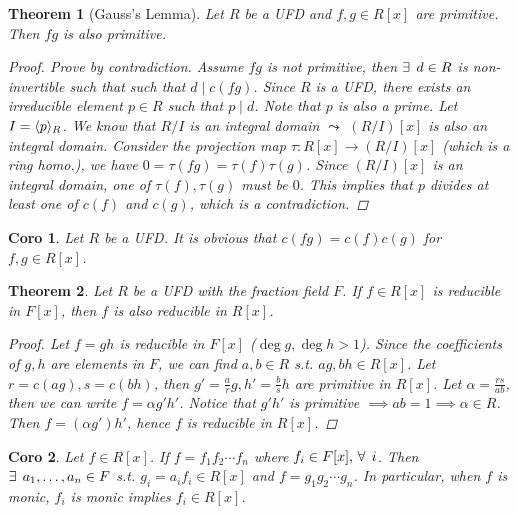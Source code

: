 \documentclass[a4paper]{article}
\let\existstemp\exists
\let\foralltemp\forall
\renewcommand*{\exists}{\existstemp\mkern4mu}
\renewcommand*{\forall}{\foralltemp\mkern4mu}
\DeclarePairedDelimiter{\gen}{\langle}{\rangle} %
\newcommand*\quot[2]{{#1}/{#2}}
\theoremstyle{mystyle}
\newtheorem{theorem}{Theorem}
\newtheorem{coro}{Coro}
\begin{document}
\begin{theorem}[Gauss's Lemma]
  Let $R$ be a UFD and $f, g \in R[x]$ are primitive. Then $fg$
  is also primitive.
  \begin{proof}
    Prove by contradiction. Assume $fg$ is not primitive, then
    $\exists d \in R$ is non-invertible such that such that $d \mid c(fg)$.
    Since $R$ is a UFD, there exists an irreducible element $p \in R$
    such that $p \mid d$. Note that $p$ is also a prime. Let $I = \gen{p}_R$.
    We know that $\quot{R}{I}$ is an integral domain $\leadsto$
    $(\quot{R}{I})[x]$ is also an integral domain.
    Consider the projection map $\tau: R[x] \to (\quot{R}{I})[x]$ (which is
    a ring homo.), we have $0 = \tau(fg) = \tau(f)\tau(g)$. Since
    $(\quot{R}{I})[x]$ is an integral domain, one of $\tau(f), \tau(g)$ must
    be $0$. This implies that $p$ divides at least one of $c(f)$ and $c(g)$,
    which is a contradiction.
  \end{proof}
\end{theorem}

\begin{coro}
  Let $R$ be a UFD. It is obvious that $c(fg) = c(f)c(g)$ for $f, g \in R[x]$.
\end{coro}

\begin{theorem}
  Let $R$ be a UFD with the fraction field $F$. If $f \in R[x]$
  is reducible in $F[x]$, then $f$ is also reducible in $R[x]$.

  \begin{proof}
    Let $f = gh$ is reducible in $F[x]$ ($\deg g, \deg h > 1$).
    Since the coefficients of $g, h$ are elements in $F$, we can find
    $a, b \in R$ s.t. $ag, bh \in R[x]$. Let $r = c(ag), s = c(bh)$, then
    $g' = \frac{a}{r}g, h' = \frac{b}{s}h$ are primitive in $R[x]$.
    Let $\alpha = \frac{rs}{ab}$, then we can write $f = \alpha g' h'$.
    Notice that $g'h'$ is primitive $\implies ab = 1 \implies \alpha \in R$.
    Then $f = (\alpha g')  h'$, hence $f$ is reducible in $R[x]$.
  \end{proof}
\end{theorem}

\begin{coro}
  Let $f \in R[x]$. If $f = f_1 f_2 \dotsm f_n$ where $f_i \in F[x],\, \forall i$.
  Then $\exists a_1, \dots, a_n \in F$ s.t. $g_i = a_if_i \in R[x]$ and
  $f = g_1 g_2 \dotsm g_n$.
  In particular, when $f$ is monic, $f_i$ is monic implies $f_i \in R[x]$.
\end{coro}
\end{document}
